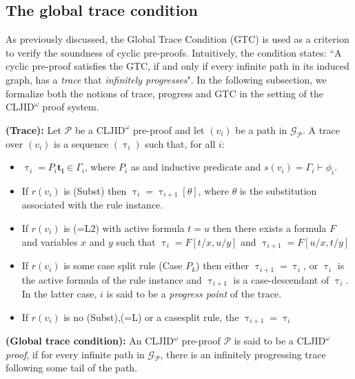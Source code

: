 \documentclass{article}
\begin{document}
\subsection{The global trace condition}
As previously discussed, the Global Trace Condition (GTC) is used as a criterion to verify the soundness of cyclic pre-proofs. Intuitively, the condition states: ``A cyclic pre-proof satisfies the GTC, if and only if every infinite path in its induced graph, has a \emph{trace} that \emph{infinitely progresses}". In the following subsection, we formalize both the notions of trace, progress and GTC in the setting of the $\text{CLJID}^{\omega}$ proof system.


\begin{definition}
    \textbf{(Trace):} Let $\mathcal{P}$ be a $\text{CLJID}^{\omega}$ pre-proof and let $(v_i)$ be a path in $\mathcal{G}_{\mathcal{P}}$. A trace over $(v_i)$ is a sequence $(\uptau_i)$ such that, for all $i$:

    \begin{itemize}
          \item $\uptau_i = P_i\mathbf{t_i} \in \Gamma_i$, where $P_i$ as and inductive predicate and $s(v_i) = \Gamma_i \vdash \phi_i$.

          \item If $r(v_i)$ is (Subst) then $\uptau_i = \uptau_{i+1}[\theta]$, where $\theta$ is the substitution associated with the rule instance.

          \item If $r(v_i)$ is (=L2) with active formula $t = u$ then there exists a formula $F$ and variables $x$ and $y$ such that $\uptau_i = F[t / x, u/y]$ and $\uptau_{i+1} = F[u / x, t/y]$

          \item If $r(v_i)$ is some case split rule (Case $P_k$) then either $\uptau_{i+1} = \uptau_i$, or $\uptau_i$ is the active formula of the rule instance and $\uptau_{i+1}$ is a case-descendant of $\uptau_i$. In the latter case, $i$ is said to be a \emph{progress point} of the trace.

          \item If $r(v_i)$ is no (Subst),(=L) or a casesplit rule, the $\uptau_{i+1} = \uptau_i$
    \end{itemize}  

\end{definition}


\begin{definition}
    \textbf{(Global trace condition):} An $\text{CLJID}^{\omega}$ pre-proof $\mathcal{P}$ is said to be a $\text{CLJID}^{\omega}$ \emph{proof}, if for every infinite path in $\mathcal{G}_{\mathcal{P}}$, there is an infinitely progressing trace following some tail of the path.
\end{definition}
\end{document}
